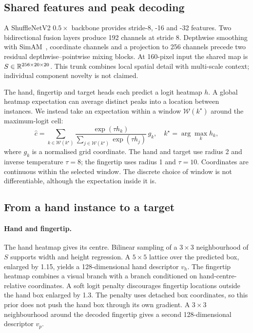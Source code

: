 \subsection{Shared features and peak decoding}
A ShuffleNetV2 $0.5\times$ backbone provides stride-8, -16 and -32 features. Two bidirectional fusion layers produce 192 channels at stride 8. Depthwise smoothing with SimAM~\cite{yang2021simam}, coordinate channels and a projection to 256 channels precede two residual depthwise--pointwise mixing blocks. At 160-pixel input the shared map is $S\in\mathbb{R}^{256\times20\times20}$. This trunk combines local spatial detail with multi-scale context; individual component novelty is not claimed.

The hand, fingertip and target heads each predict a logit heatmap $h$. A global heatmap expectation can average distinct peaks into a location between instances. We instead take an expectation within a window $\mathcal W(k^\star)$ around the maximum-logit cell:
\begin{equation}
 \hat c=\sum_{k\in\mathcal W(k^\star)}
 \frac{\exp(\tau h_k)}{\sum_{j\in\mathcal W(k^\star)}\exp(\tau h_j)}\,g_k ,
 \quad k^\star=\arg\max_k h_k ,
 \label{eq:decode}
\end{equation}
where $g_k$ is a normalised grid coordinate. The hand and target use radius 2 and inverse temperature $\tau=8$; the fingertip uses radius 1 and $\tau=10$. Coordinates are continuous within the selected window. The discrete choice of window is not differentiable, although the expectation inside it is.

\subsection{From a hand instance to a target}
\paragraph{Hand and fingertip.}
The hand heatmap gives its centre. Bilinear sampling of a $3\times3$ neighbourhood of $S$ supports width and height regression. A $5\times5$ lattice over the predicted box, enlarged by 1.15, yields a 128-dimensional hand descriptor $v_h$. The fingertip heatmap combines a visual branch with a branch conditioned on hand-centre-relative coordinates. A soft logit penalty discourages fingertip locations outside the hand box enlarged by 1.3. The penalty uses detached box coordinates, so this prior does not push the hand box through its own gradient. A $3\times3$ neighbourhood around the decoded fingertip gives a second 128-dimensional descriptor $v_p$.


